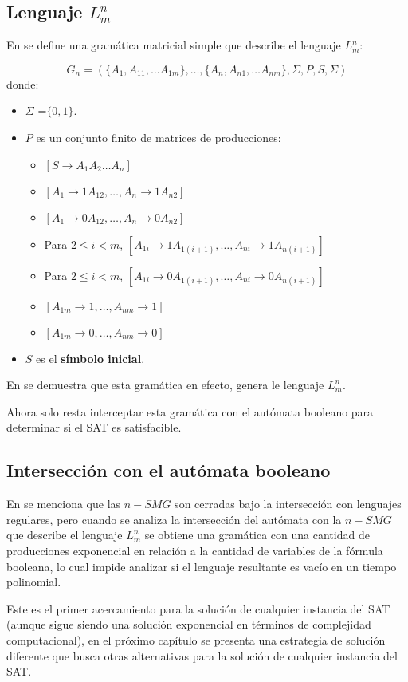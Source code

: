 \subsection{Lenguaje $L^n_m$}

En \cite{aSMSAT} se define una gramática matricial simple que describe el lenguaje $L^n_m$:

$$
      G_n=(\{A_1,A_{11},\ldots A_{1m}\},\ldots,\{A_n,A_{n1},\ldots A_{nm}\},\Sigma,P,S,\Sigma)
$$
donde:
\begin{itemize}
      \item \( \Sigma \) =$\{0,1\}$.
      \item \( P \) es un conjunto finito de matrices de producciones:
            \begin{itemize}
                  \item  $[S \to A_1A_2\ldots A_n]$
                  \item  $[A_1 \to 1A_{12}, \ldots, A_n \to 1A_{n2}]$
                  \item  $[A_1 \to 0A_{12}, \ldots, A_n \to 0A_{n2}]$
                  \item  Para $2 \leq i < m$, $[A_{1i} \to 1A_{1(i+1)}, \ldots, A_{ni} \to 1A_{n(i + 1)}]$
                  \item  Para $2 \leq i < m$, $[A_{1i} \to 0A_{1(i+1)}, \ldots, A_{ni} \to 0A_{n(i + 1)}]$
                  \item  $[A_{1m} \to 1, \ldots, A_{nm} \to 1]$
                  \item  $[A_{1m} \to 0, \ldots, A_{nm} \to 0]$
            \end{itemize}
      \item \( S \) es el \textbf{símbolo inicial}.
\end{itemize}

En \cite{simpleMatrixLanguages} se demuestra que esta gramática en efecto, genera le lenguaje $L^n_m$.

Ahora solo resta interceptar esta gramática con el autómata booleano para determinar si el SAT es satisfacible.

\subsection{Intersección con el autómata booleano}

En \cite{aSMSAT} se menciona que las $n-SMG$ son cerradas bajo la intersección con lenguajes regulares,
pero cuando se analiza la intersección del autómata con la $n-SMG$ que describe el lenguaje $L^n_m$ se
obtiene una gramática con una cantidad de producciones exponencial en relación a la cantidad de variables
de la fórmula booleana, lo cual impide analizar si el lenguaje resultante es vacío en un tiempo polinomial.

Este es el primer acercamiento para la solución de cualquier instancia del SAT (aunque sigue siendo una solución exponencial
en términos de complejidad computacional), en el próximo capítulo se presenta una estrategia de solución diferente
que busca otras alternativas para la solución de cualquier instancia del SAT.
